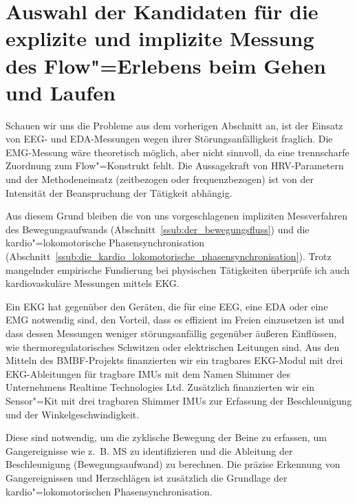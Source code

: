 

\section{Auswahl der Kandidaten für die explizite und implizite Messung des Flow"=Erlebens beim Gehen und Laufen} 

\label{sec:auswahl_der_kandidaten_fur_die_explizite_und_implizite_messung_des_flow_erlebens_beim_gehen_und_laufen}

Schauen wir uns die Probleme aus dem vorherigen Abschnitt an, ist der Einsatz von \ac{EEG}- und \ac{EDA}-Messungen wegen ihrer Störungsanfälligkeit fraglich. Die \ac{EMG}-Messung wäre theoretisch möglich, aber nicht sinnvoll, da eine trennscharfe Zuordnung zum Flow"=Konstrukt fehlt. Die Aussagekraft von \ac{HRV}-Parametern und der Methodeneinsatz (zeitbezogen oder frequenzbezogen) ist von der Intensität der Beanspruchung der Tätigkeit abhängig.

Aus diesem Grund bleiben die von uns vorgeschlagenen impliziten Messverfahren des Bewegungsaufwands (Abschnitt~\ref{ssub:der_bewegungsfluss}) und die kardio"=lokomotorische Phasensynchronisation (Abschnitt~\ref{ssub:die_kardio_lokomotorische_phasensynchronisation}). Trotz mangelnder empirische Fundierung bei physischen Tätigkeiten überprüfe ich auch kardiovaskuläre Messungen mittels \ac{EKG}. 

Ein \ac{EKG} hat gegenüber den Geräten, die für eine \ac{EEG}, eine \ac{EDA} oder eine \ac{EMG} notwendig sind, den Vorteil, dass es effizient im Freien einzusetzen ist und dass dessen Messungen weniger störungsanfällig gegenüber äußeren Einflüssen, wie thermoregulatorisches Schwitzen oder elektrischen Leitungen sind. Aus den Mitteln des \acs{BMBF}-Projekts finanzierten wir ein tragbares \ac{EKG}-Modul mit drei \ac{EKG}-Ableitungen für tragbare \acp{IMU} mit dem Namen Shimmer des Unternehmens Realtime Technologies Ltd. Zusätzlich finanzierten wir ein Sensor"=Kit mit drei tragbaren Shimmer \acp{IMU} zur Erfassung der Beschleunigung und der Winkelgeschwindigkeit.

Diese sind notwendig, um die zyklische Bewegung der Beine zu erfassen, um Gangereignisse wie z.~B. \ac{MS} zu identifizieren und die Ableitung der Beschleunigung (Bewegungsaufwand) zu berechnen. Die präzise Erkennung von Gangereignissen und Herzschlägen ist zusätzlich die Grundlage der kardio"=lokomotorischen Phasensynchronisation. 

